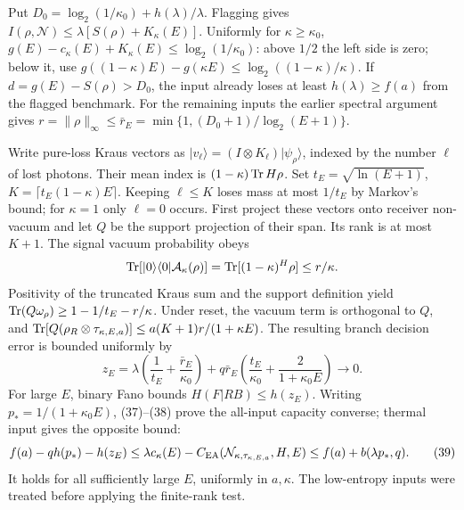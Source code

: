 Put \(D_0=\log_2(1/\kappa_0)+h(\lambda)/\lambda\).
Flagging gives \(I(\rho,\mathcal N)\le\lambda[S(\rho)+K_\kappa(E)]\).
Uniformly for \(\kappa\ge\kappa_0\),
\(g(E)-c_\kappa(E)+K_\kappa(E)\le\log_2(1/\kappa_0)\):
above \(1/2\) the left side is zero; below it, use
\(g((1-\kappa)E)-g(\kappa E)\le\log_2((1-\kappa)/\kappa)\).
If \(d=g(E)-S(\rho)>D_0\), the input already loses at least
\(h(\lambda)\ge f(a)\) from the flagged benchmark.
For the remaining inputs the earlier spectral argument gives
\(r=\|\rho\|_\infty\le\bar r_E=\min\{1,(D_0+1)/\log_2(E+1)\}\).

Write pure-loss Kraus vectors as
\(|v_\ell\rangle=(I\otimes K_\ell)|\psi_\rho\rangle\), indexed by
the number \(\ell\) of lost photons. Their mean index is
\((1-\kappa)\operatorname{Tr} H\rho\).
Set \(t_E=\sqrt{\ln(E+1)}\), \(K=\lceil t_E(1-\kappa)E\rceil\).
Keeping \(\ell\le K\) loses mass at most \(1/t_E\) by Markov's bound;
for \(\kappa=1\) only \(\ell=0\) occurs.
First project these vectors onto receiver non-vacuum and let \(Q\) be
the support projection of their span. Its rank is at most \(K+1\).
The signal vacuum probability obeys
\[
 \operatorname{Tr}[|0\rangle\langle0|\mathcal A_\kappa(\rho)]
   =\operatorname{Tr}[(1-\kappa)^H\rho]\le r/\kappa .
\]
Positivity of the truncated Kraus sum and the support definition yield
\(\operatorname{Tr}(Q\omega_\rho)\ge1-1/t_E-r/\kappa\).
Under reset, the vacuum term is orthogonal to \(Q\), and
\(\operatorname{Tr}[Q(\rho_R\otimes\tau_{\kappa,E,a})]
   \le a(K+1)r/(1+\kappa E)\).
The resulting branch decision error is bounded uniformly by
\[
 z_E=\lambda\left(\frac1{t_E}+\frac{\bar r_E}{\kappa_0}\right)
       +q\bar r_E\left(\frac{t_E}{\kappa_0}
                              +\frac2{1+\kappa_0 E}\right)\to0 .
                                                               \tag{38}
\]
For large \(E\), binary Fano bounds \(H(F|RB)\le h(z_E)\).
Writing \(p_*=1/(1+\kappa_0 E)\), (37)--(38) prove the all-input
capacity converse; thermal input gives the opposite bound:
\[
 f(a)-q h(p_*)-h(z_E)
 \le\lambda c_\kappa(E)-C_{\mathrm{EA}}(\mathcal N_{\kappa,\tau_{\kappa,E,a}},H,E)
 \le f(a)+b(\lambda p_*,q).                                  \tag{39}
\]
It holds for all sufficiently large \(E\), uniformly in \(a,\kappa\).
The low-entropy inputs were treated before applying the finite-rank test.

